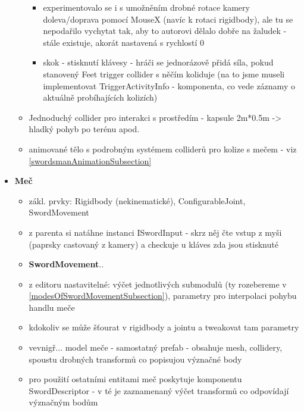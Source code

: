 \begin{itemize}
\begin{itemize}
\begin{itemize}
          \item experimentovalo se i s umožněním drobné rotace kamery doleva/doprava pomocí MouseX (navíc k rotaci rigidbody), ale tu se nepodařilo vychytat tak, aby to autorovi dělalo dobře na žaludek - stále existuje, akorát nastavená s rychlostí 0
          \item skok - stisknutí klávesy - hráči se jednorázově přidá síla, pokud stanovený Feet trigger collider s něčím koliduje (na to jsme museli implementovat TriggerActivityInfo - komponenta, co vede záznamy o aktuálně probíhajících kolizích)
        \end{itemize}
       \item Jednoduchý collider pro interakci s prostředím - kapsule 2m*0.5m -> hladký pohyb po terénu apod.
       \item animované tělo s podrobným systémem colliderů pro kolize s mečem - viz \ref{swordsmanAnimationSubsection}
    \end{itemize}
  \item \textbf{Meč}
    \begin{itemize}
      \item zákl. prvky: Rigidbody (nekinematické), ConfigurableJoint, SwordMovement
      \item z parenta si natáhne instanci ISwordInput - skrz něj čte vstup z myši (paprsky castovaný z kamery) a checkuje u kláves zda jsou stisknuté
      \item \textbf{SwordMovement}..
      \item z editoru nastavitelné: výčet jednotlivých submodulů (ty rozebereme v \ref{modesOfSwordMovementSubsection}), parametry pro interpolaci pohybu handlu meče
      \item kdokoliv se může šťourat v rigidbody a jointu a tweakovat tam parametry
      \item vevnigř... model meče - samostatný prefab - obsahuje mesh, collidery, spoustu drobných transformů co popisujou význačné body
      \item pro použití ostatními entitami meč poskytuje komponentu SwordDescriptor - v té je zaznamenaný výčet transformů co odpovídají význačným bodům
    \end{itemize}
\end{itemize}

